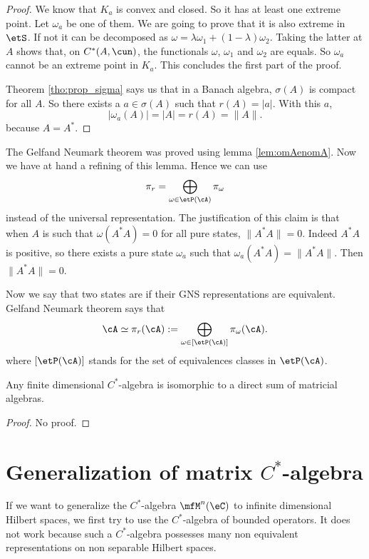 \begin{proof}
We know that $K_a$ is convex and closed. So it has at least one extreme point. Let $\omega_a$ be one of them. We are going to prove that it is also extreme in $\etS$. If not it can be decomposed as $\omega=\lambda\omega_1+(1-\lambda)\omega_2$. Taking the latter at $A$ shows that, on $C^*(A,\cun)$, the functionals $\omega$, $\omega_1$ and $\omega_2$ are equals. So $\omega_a$ cannot be an extreme point in $K_a$. This concludes the first part of the proof. 


Theorem \ref{tho:prop_sigma} says us that in a Banach algebra, $\sigma(A)$ is compact for all $A$. So there exists a $a\in\sigma(A)$ such that $r(A)=| a |$. With this $a$,
 \[ 
  | \omega_a(A) |=| A |=r(A)=\| A \|.
\]
because $A=A^*$.

\end{proof}

The Gelfand Neumark theorem was proved using lemma \ref{lem:omAenomA}. Now we have at hand a refining of this lemma. Hence we can use
\[ 
  \pi_r=\bigoplus_{\omega\in\etP(\cA)}\pi_{\omega}
\]
instead of the universal representation. The justification of this claim is that when $A$ is such that $\omega(A^*A)=0$ for all pure states, $\| A^*A \|=0$. Indeed $A^*A$ is positive, so there exists a pure state $\omega_a$ such that $\omega_a(A^*A)=\| A^*A \|$. Then $\| A^*A \|=0$.
 
Now we say that two states are  if their GNS representations are equivalent. Gelfand Neumark theorem  says that
\[ 
  \cA\simeq\pi_r(\cA):=\bigoplus_{\omega\in[\etP(\cA)]}\pi_{\omega}(\cA).
\]
where $[\etP(\cA)]$ stands for the set of equivalences classes in $\etP(\cA)$.

\begin{proposition}
Any finite dimensional $C^*$-algebra is isomorphic to a direct sum of matricial algebras.
\end{proposition}
\begin{proof}
    No proof.
\end{proof}

\section{Generalization of matrix \texorpdfstring{$C^*$}{C}-algebra}

If we want to generalize the $C^*$-algebra $\mfM^n(\eC)$ to infinite dimensional Hilbert spaces, we first try to use the $C^*$-algebra of bounded operators. It does not work because such a $C^*$-algebra possesses many non equivalent representations on non separable Hilbert spaces.

